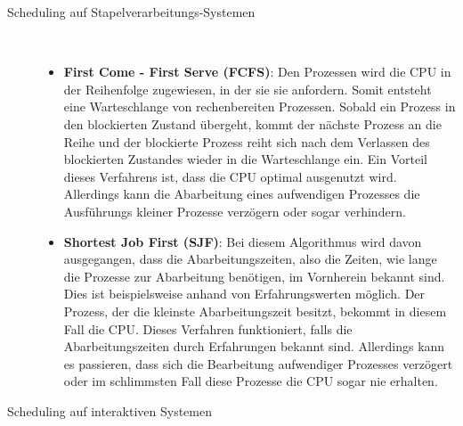 \begin{description}
						\begin{description}
							\item[Scheduling auf Stapelverarbeitungs-Systemen]~\par	%

								\begin{itemize}
									\item
										\textbf{First Come - First Serve (FCFS)}: Den Prozessen wird die CPU in der Reihenfolge zugewiesen, in der sie sie anfordern. Somit entsteht eine Warteschlange von rechenbereiten Prozessen. Sobald ein Prozess in den blockierten Zustand übergeht, kommt der nächste Prozess an die Reihe und der blockierte Prozess reiht sich nach dem Verlassen des blockierten Zustandes wieder in die Warteschlange ein. Ein Vorteil dieses Verfahrens ist, dass die CPU optimal ausgenutzt wird. Allerdings kann die Abarbeitung eines aufwendigen Prozesses die Ausführungs kleiner Prozesse verzögern oder sogar verhindern.
									\item
										\textbf{Shortest Job First (SJF)}: Bei diesem Algorithmus wird davon ausgegangen, dass die Abarbeitungszeiten, also die Zeiten, wie lange die Prozesse zur Abarbeitung benötigen, im Vornherein bekannt sind. Dies ist beispielsweise anhand von Erfahrungswerten möglich. Der Prozess, der die kleinste Abarbeitungszeit besitzt, bekommt in diesem Fall die CPU. Dieses Verfahren funktioniert, falls die Abarbeitungszeiten durch Erfahrungen bekannt sind. Allerdings kann es passieren, dass sich die Bearbeitung aufwendiger Prozesses verzögert oder im schlimmsten Fall diese Prozesse die CPU sogar nie erhalten.
								\end{itemize}
							
							\item[Scheduling auf interaktiven Systemen]~\par	%
							

\end{description}
\end{description}
